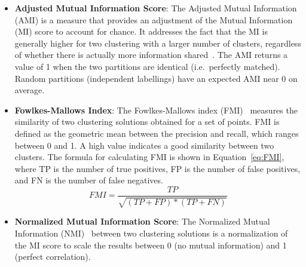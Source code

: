 \documentclass{article}
\begin{document}
\begin{itemize}
 
    \item \textbf{Adjusted Mutual Information Score}: The Adjusted Mutual Information (AMI) is a measure that provides an adjustment of the Mutual Information (MI) score to account for chance. It addresses the fact that the MI is generally higher for two clustering with a larger number of clusters, regardless of whether there is actually more information shared~\cite{vinhInformationTheoreticMeasures2010}. The AMI returns a value of 1 when the two partitions are identical (i.e.\ perfectly matched). Random partitions (independent labellings) have an expected AMI near 0 on average.

    \item \textbf{Fowlkes-Mallows Index}: The Fowlkes-Mallows index (FMI)~\cite{fowlkesMethodComparingTwo1983} measures the similarity of two clustering solutions obtained for a set of points. FMI is defined as the geometric mean between the precision and recall, which ranges between 0 and 1. A high value indicates a good similarity between two clusters. The formula for calculating FMI is shown in Equation~\autoref{eq:FMI}, where TP is the number of true positives, FP is the number of false positives, and FN is the number of false negatives.
    \begin{equation}
        FMI = \frac{TP}{\sqrt{(TP + FP) * (TP + FN)}}
    \label{eq:FMI}
    \end{equation}
    
    \item \textbf{Normalized Mutual Information Score}: The Normalized Mutual Information (NMI)~\cite{amelioNormalizedMutualInformation2015} between two clustering solutions is a normalization of the MI score to scale the results between 0 (no mutual information) and 1 (perfect correlation).
\end{itemize}
 
\end{document}
